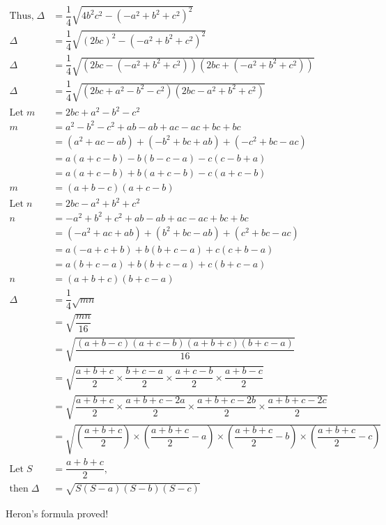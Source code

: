 \documentclass[
]{book}
\begin{document}
\[
\begin{aligned}
\text{Thus,}\; \Delta &= \dfrac{1}{4} \sqrt{4b^2c^2 - (-a^2 + b^2 + c^2)^2} \\
\Delta &= \dfrac{1}{4} \sqrt{(2bc)^2 - (-a^2 + b^2 + c^2)^2} \\
\Delta &= \dfrac{1}{4} \sqrt{(2bc - (-a^2 + b^2 + c^2))(2bc + (-a^2 + b^2 + c^2))} \\
\Delta &= \dfrac{1}{4} \sqrt{(2bc + a^2 - b^2 - c^2)(2bc - a^2 + b^2 + c^2)} \\
\text{Let}\; m &= 2bc + a^2 - b^2 - c^2 \\
m &= a^2 - b^2 - c^2 + ab - ab + ac - ac + bc + bc \\
&= (a^2 + ac - ab) + (-b^2 + bc + ab) + (-c^2 + bc - ac) \\
&= a(a + c - b) - b(b - c - a) - c(c - b + a) \\
&= a(a + c - b) + b(a + c - b) - c(a + c - b) \\
m &= (a + b - c)(a + c - b) \\
\text{Let}\; n &= 2bc - a^2 + b^2 + c^2 \\
n &= -a^2 + b^2 + c^2 + ab - ab + ac - ac + bc + bc \\
&= (-a^2 + ac + ab) + (b^2 + bc - ab) + (c^2 + bc - ac) \\
&= a(-a + c + b) + b(b + c - a) + c(c + b - a) \\
&= a(b + c - a) + b(b + c - a) + c(b + c - a) \\
n &= (a + b + c)(b + c - a) \\
\Delta &= \dfrac{1}{4} \sqrt{mn} \\
&= \sqrt{\dfrac{mn}{16}} \\
&= \sqrt{\dfrac{(a + b - c)(a + c - b)(a + b + c)(b + c - a)}{16}} \\
&= \sqrt{\dfrac{a + b + c}{2} \times \dfrac{b + c - a}{2} \times \dfrac{a + c - b}{2} \times \dfrac{a + b - c}{2}} \\
&= \sqrt{\dfrac{a + b + c}{2} \times \dfrac{a + b + c - 2a}{2} \times \dfrac{a + b + c - 2b}{2} \times \dfrac{a + b + c - 2c}{2}} \\
&= \sqrt{\left(\dfrac{a + b + c}{2}\right) \times \left(\dfrac{a + b + c}{2} - a\right) \times \left(\dfrac{a + b + c}{2} - b\right) \times \left(\dfrac{a + b + c}{2} - c\right)} \\
\text{Let}\; S &= \dfrac{a + b + c}{2}, \\
\text{then}\; \Delta &= \sqrt{S(S - a)(S - b)(S - c)}
\end{aligned}
\]

Heron's formula proved!


\end{document}
